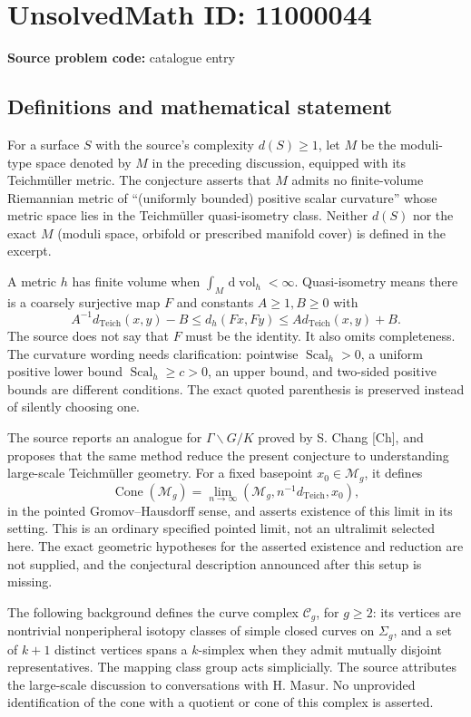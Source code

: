 \documentclass[11pt]{article}
\newcommand{\dd}{\,\mathrm{d}}
\begin{document}
\section*{UnsolvedMath ID: 11000044}
\textbf{Source problem code:} catalogue entry
\subsection{Definitions and mathematical statement}
For a surface \(S\) with the source's complexity \(d(S)\geq1\), let \(M\) be the moduli-type space denoted by \(M\) in the preceding discussion, equipped with its Teichm\"uller metric. The conjecture asserts that \(M\) admits no finite-volume Riemannian metric of ``(uniformly bounded) positive scalar curvature'' whose metric space lies in the Teichm\"uller quasi-isometry class. Neither \(d(S)\) nor the exact \(M\) (moduli space, orbifold or prescribed manifold cover) is defined in the excerpt.

A metric \(h\) has finite volume when \(\int_M\dd\operatorname{vol}_h<\infty\). Quasi-isometry means there is a coarsely surjective map \(F\) and constants \(A\geq1,B\geq0\) with
\[A^{-1}d_{\mathrm{Teich}}(x,y)-B\leq d_h(Fx,Fy)\leq A d_{\mathrm{Teich}}(x,y)+B.\]
The source does not say that \(F\) must be the identity. It also omits completeness. The curvature wording needs clarification: pointwise \(\operatorname{Scal}_h>0\), a uniform positive lower bound \(\operatorname{Scal}_h\geq c>0\), an upper bound, and two-sided positive bounds are different conditions. The exact quoted parenthesis is preserved instead of silently choosing one.

The source reports an analogue for \(\Gamma\backslash G/K\) proved by S. Chang [Ch], and proposes that the same method reduce the present conjecture to understanding large-scale Teichm\"uller geometry. For a fixed basepoint \(x_0\in\mathcal M_g\), it defines
\[\operatorname{Cone}(\mathcal M_g)=\lim_{n\to\infty}(\mathcal M_g,n^{-1}d_{\mathrm{Teich}},x_0),\tag{10}\]
in the pointed Gromov--Hausdorff sense, and asserts existence of this limit in its setting. This is an ordinary specified pointed limit, not an ultralimit selected here. The exact geometric hypotheses for the asserted existence and reduction are not supplied, and the conjectural description announced after this setup is missing.

The following background defines the curve complex \(\mathcal C_g\), for \(g\geq2\): its vertices are nontrivial nonperipheral isotopy classes of simple closed curves on \(\Sigma_g\), and a set of \(k+1\) distinct vertices spans a \(k\)-simplex when they admit mutually disjoint representatives. The mapping class group acts simplicially. The source attributes the large-scale discussion to conversations with H. Masur. No unprovided identification of the cone with a quotient or cone of this complex is asserted.
\end{document}
